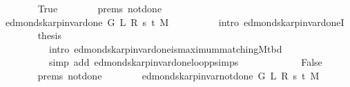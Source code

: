 \begin{isabellebody}
\ \ \ \ \ \ \isamarkupfalse%
\ True\isanewline
\ \ \ \ \ \ \isamarkupfalse%
\ {\isachardoublequoteopen}{}{\isachardot}{\kern0pt}prems{\isachardoublequoteclose}\ not{\isacharunderscore}{\kern0pt}done{\isacharunderscore}{\kern0pt}{}\isanewline
\ \ \ \ \ \ \isamarkupfalse%
\ {\isachardoublequoteopen}edmonds{\isacharunderscore}{\kern0pt}karp{\isacharunderscore}{\kern0pt}invar{\isacharunderscore}{\kern0pt}done{\isacharunderscore}{\kern0pt}{}{\isacharprime}{\kern0pt}\ G\ L\ R\ s\ t\ M{\isachardoublequoteclose}\isanewline
\ \ \ \ \ \ \ \ \isamarkupfalse%
\ {\isacharparenleft}{\kern0pt}intro\ edmonds{\isacharunderscore}{\kern0pt}karp{\isacharunderscore}{\kern0pt}invar{\isacharunderscore}{\kern0pt}done{\isacharunderscore}{\kern0pt}{}I{\isacharunderscore}{\kern0pt}{}{\isacharparenright}{\kern0pt}\isanewline
\ \ \ \ \ \ \isamarkupfalse%
\ {\isacharquery}{\kern0pt}thesis\isanewline
\ \ \ \ \ \ \ \ \isamarkupfalse%
\isanewline
\ \ \ \ \ \ \ \ \ \ {\isacharparenleft}{\kern0pt}intro\ edmonds{\isacharunderscore}{\kern0pt}karp{\isacharunderscore}{\kern0pt}invar{\isacharunderscore}{\kern0pt}done{\isacharunderscore}{\kern0pt}{}{\isachardot}{\kern0pt}is{\isacharunderscore}{\kern0pt}maximum{\isacharunderscore}{\kern0pt}matching{\isacharunderscore}{\kern0pt}M{\isacharunderscore}{\kern0pt}tbd{\isacharparenright}{\kern0pt}\isanewline
\ \ \ \ \ \ \ \ \ \ {\isacharparenleft}{\kern0pt}simp\ add{\isacharcolon}{\kern0pt}\ edmonds{\isacharunderscore}{\kern0pt}karp{\isacharunderscore}{\kern0pt}invar{\isacharunderscore}{\kern0pt}done{\isacharunderscore}{\kern0pt}{}{\isachardot}{\kern0pt}loop{\isacharprime}{\kern0pt}{\isacharunderscore}{\kern0pt}psimps{\isacharparenright}{\kern0pt}\isanewline
\ \ \ \ \isamarkupfalse%
\isanewline
\ \ \ \ \ \ \isamarkupfalse%
\ False\isanewline
\ \ \ \ \ \ \isamarkupfalse%
\ {\isachardoublequoteopen}{}{\isachardot}{\kern0pt}prems{\isachardoublequoteclose}\ not{\isacharunderscore}{\kern0pt}done{\isacharunderscore}{\kern0pt}{}\isanewline
\ \ \ \ \ \ \isamarkupfalse%
\ {\isachardoublequoteopen}edmonds{\isacharunderscore}{\kern0pt}karp{\isacharunderscore}{\kern0pt}invar{\isacharunderscore}{\kern0pt}not{\isacharunderscore}{\kern0pt}done{\isacharunderscore}{\kern0pt}{}{\isacharprime}{\kern0pt}\ G\ L\ R\ s\ t\ M{\isachardoublequoteclose}\isanewline
\ \ \ \ \ \ \ \ \isamarkupfalse%

\end{isabellebody}
